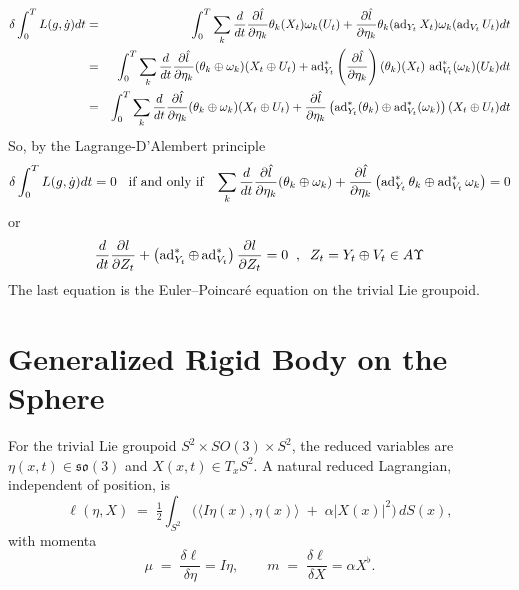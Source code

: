 \documentclass{article}
\begin{document}
\begin{eqnarray}{\label{EDI}}
\delta \int^T_0L(g, \dot{g})dt&=&\int^T_0\sum_k \frac{d}{dt}\frac{\partial\hat{l}}{\partial{\eta_k}}\theta_k(X_t)\omega_k(U_t)+ \frac{\partial\hat{l}}{\partial{\eta_k}}\theta_k(\operatorname{ad}_{Y_t}X_t)\omega_k(\operatorname{ad}_{V_t}U_t)dt\\\nonumber
&=&\int^T_0\sum_k \frac{d}{dt}\frac{\partial\hat{l}}{\partial{\eta_k}}(\theta_k\oplus \omega_k)(X_t\oplus U_t)+ \operatorname{ad}^*_{Y_t}\left(\frac{\partial\hat{l}}{\partial{\eta_k}}\right)(\theta_k)(X_t)\,\operatorname{ad}^*_{V_t}(\omega_k)(U_k)dt\\ \nonumber
&=&\int^T_0\sum_k \frac{d}{dt}\frac{\partial\hat{l}}{\partial{\eta_k}}(\theta_k\oplus \omega_k)(X_t\oplus U_t)+ \frac{\partial\hat{l}}{\partial{\eta_k}}\left( \operatorname{ad}^*_{Y_t}(\theta_k)\oplus \operatorname{ad}^*_{V_t}(\omega_k)\right)(X_t\oplus U_t)dt
\end{eqnarray}
So, by the Lagrange-D'Alembert principle 
\begin{eqnarray}{\label{EDI2}}
\delta \int^T_0L(g, \dot{g})dt= 0 \;\; \text{ if and only if } \;\; \sum_k \frac{d}{dt}\frac{\partial\hat{l}}{\partial{\eta_k}}(\theta_k\oplus \omega_k)+ \frac{\partial\hat{l}}{\partial{\eta_k}}\left( \operatorname{ad}^*_{Y_t}\theta_k\oplus \operatorname{ad}^*_{V_t}\omega_k\right)=0
\end{eqnarray}
or 
\begin{eqnarray}{\label{EDI3}}
 \frac{d}{dt}\frac{\partial l}{\partial{Z_t}} + \left( \operatorname{ad}^*_{Y_t}\oplus \operatorname{ad}^*_{V_t}\right) \frac{\partial l}{\partial{Z_t}} = 0 \;\; , \;\; Z_t = Y_t\oplus V_t \in A\Upsilon
\end{eqnarray}
The last equation is the Euler--Poincar\'e equation on the trivial Lie groupoid.

\section*{Generalized Rigid Body on the Sphere}

For the trivial Lie groupoid $S^2 \times SO(3) \times S^2$, the reduced variables are
\(\eta(x,t)\in\mathfrak{so}(3)\) and \(X(x,t)\in T_x S^2\).
A natural reduced Lagrangian, independent of position, is
\begin{equation}
\ell(\eta,X) \;=\; \tfrac12 \int_{S^2} \Big( \langle I \eta(x), \eta(x)\rangle \;+\; \alpha |X(x)|^2 \Big)\, dS(x),
\end{equation}
with momenta
\begin{equation}
\mu \;=\; \frac{\delta \ell}{\delta \eta} = I\eta,
\qquad
m \;=\; \frac{\delta \ell}{\delta X} = \alpha X^\flat.
\end{equation}
\end{document}
